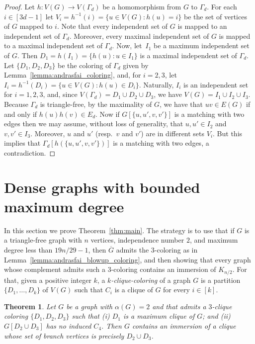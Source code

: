 \documentclass[a4paper,12pt]{article}
\newtheorem{theorem}{Theorem}
\newcommand{\Gcompl}{\overline{G}}
\begin{document}
\begin{proof}
	Let \(h \colon V(G) \to V(\Gamma_d)\) be a homomorphism from \(G\) to \(\Gamma_d\).
	For each \(i\in [3d-1]\) let \(V_i = h^{-1}(i) = \{u\in V(G) : h(u) = i\}\)
	be the set of vertices of \(G\) mapped to \(i\).
	Note that every independent set of \(G\) is mapped to an independent set of \(\Gamma_d\).
	Moreover, every maximal independent set of \(G\) is mapped to a maximal independent set of \(\Gamma_d\).
	Now, let~\(I_1\) be a maximum independent set of \(G\).
	Then \(D_1 = h(I_1) = \{h(u) : u \in I_1\}\) is a maximal independent set of \(\Gamma_d\).
	Let \(\{D_1,D_2,D_3\}\) be the coloring of \(\Gamma_d\) given by Lemma~\ref{lemma:andrasfai_coloring},
	and, for \(i = 2,3\), let \(I_i = h^{-1}(D_i) = \{u \in V(G) : h(u) \in D_i\}\).
	Naturally, \(I_i\) is an independent set for \(i = 1,2,3\),
	and, since \(V(\Gamma_d) = D_1\cup D_2\cup D_3\),
	we have \(V(G) = I_1 \cup I_2 \cup I_3\).
	Because \(\Gamma_d\) is triangle-free,
	by the maximality of \(G\), 
	we have that \(uv\in E(G)\) if and only if \(h(u)h(v)\in E_d\).
	Now if \(G[\{u,u',v,v'\}]\) is a matching with two edges
	then we may assume, without loss of generality,
	that \(u,u' \in I_2\) and \(v,v'\in I_3\).
	Moreover, \(u\) and \(u'\) (resp.\ \(v\) and \(v'\)) are in different sets \(V_i\).
	But this implies that \(\Gamma_d[h(\{u,u',v,v'\})]\) is a matching with two edges,
	a contradiction.
\end{proof}


\section{Dense graphs with bounded maximum degree}\label{sec:main-result}

In this section we prove Theorem~\ref{thm:main}.
The strategy is to use that if \(G\) is a triangle-free graph with \(n\) vertices,
independence number \(2\), and maximum degree less than \(19n/29 - 1\),
then \(\Gcompl\) admits the \(3\)-coloring as in Lemma~\ref{lemma:andrasfai_blowup_coloring},
and then showing that every graph whose complement admits such a \(3\)-coloring
contains an immersion of \(K_{n/2}\).
For that, given a positive integer \(k\),
a \emph{\(k\)-clique-coloring} of a graph \(G\) is a partition \(\{D_1,\ldots, D_k\}\) of \(V(G)\)
such that \(C_i\) is a clique of \(G\) for every \(i\in[k]\).

\begin{theorem}\label{thm:graphs_with_special_clique_coloring}
	Let \(G\) be a graph with \(\alpha(G) = 2\)
	and that admits a \(3\)-clique coloring \(\{D_1,D_2,D_3\}\) such that
	(i) \(D_1\) is a maximum clique of \(G\); and
	(ii) \(G[D_2\cup D_3]\) has no induced \(C_4\).
	Then \(G\) contains an immersion of a clique whose set of branch vertices is precisely \(D_2\cup D_3\).
\end{theorem}
\end{document}
